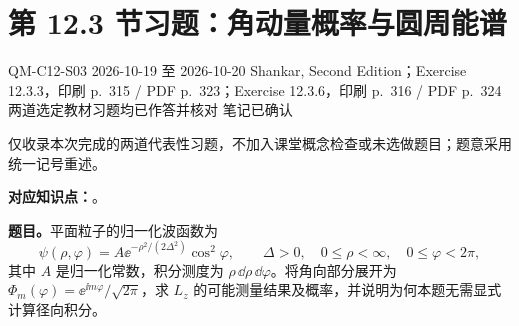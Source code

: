 \section{第 12.3 节习题：角动量概率与圆周能谱}
\label{exercises:QM-C12-S03}
\exercisemeta
  {QM-C12-S03}
  {2026-10-19 至 2026-10-20}
  {Shankar, Second Edition；Exercise 12.3.3，印刷 p.~315 / PDF p.~323；Exercise 12.3.6，印刷 p.~316 / PDF p.~324}
  {两道选定教材习题均已作答并核对}
  {笔记已确认}

仅收录本次完成的两道代表性习题，不加入课堂概念检查或未选做题目；题意采用统一记号重述。

\textbf{对应知识点：}。

\textbf{题目。}平面粒子的归一化波函数为
\begin{equation}
  \psi(\rho,\varphi)=A\ee^{-\rho^2/(2\Delta^2)}\cos^2\varphi,
  \qquad \Delta>0,\quad 0\leq\rho<\infty,\quad 0\leq\varphi<2\pi,
\end{equation}
其中 $A$ 是归一化常数，积分测度为 $\rho\,\dd\rho\,\dd\varphi$。将角向部分展开为 $\Phi_m(\varphi)=\ee^{\ii m\varphi}/\sqrt{2\pi}$，求 $L_z$ 的可能测量结果及概率，并说明为何本题无需显式计算径向积分。

